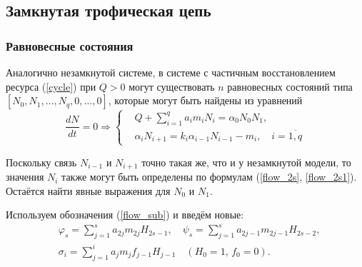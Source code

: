 \subsection{Замкнутая трофическая цепь}
    \subsubsection{Равновесные состояния}
        Аналогично незамкнутой системе, в системе с частичным восстановлением ресурса (\ref{cycle}) при \(Q > 0\) могут существовать \( n \) равновесных состояний типа \(\left[ N_0, N_1, \ldots, N_q, 0, \ldots, 0 \right]\), которые могут быть найдены из уравнений
        \begin{equation} \label{cycle_stationary_equations}
            \frac{dN}{dt} = 0 \Rightarrow
            \left\lbrace\begin{split}
                & Q + \sum_{i=1}^{q} a_i m_i N_i = \alpha_0 N_0 N_1, \\
                & \alpha_i N_{i+1} = k_i \alpha_{i-1} N_{i-1} - m_i, \quad i=\overline{1,q}                
            \end{split}\right.
        \end{equation}

        Поскольку связь \(N_{i-1}\) и \(N_{i+1}\) точно такая же, что и у незамкнутой модели, то значения \(N_i\) также могут быть определены по формулам (\ref{flow_2s}, \ref{flow_2s1}). Остаётся найти явные выражения для \(N_0\) и \( N_1\).
        
        Используем обозначения (\ref{flow_sub}) и введём новые:
        \begin{equation}
            \begin{split}
            & \varphi_s = \sum_{j=1}^{s} a_{2j} m_{2j} H_{2s-1}, \quad 
            \psi_s = \sum_{j=1}^{s} a_{2j-1} m_{2j-1} H_{2s-2}, \\
            & \sigma_i = \sum_{j=1}^{i} a_j m_j f_{j-1} H_{j-1} \quad (H_0 = 1, \, f_0 = 0).
            \end{split}
        \end{equation}

